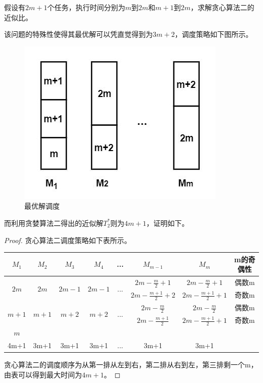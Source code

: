 \begin{example}
	假设有$2m+1$个任务，执行时间分别为$m$到$2m$和$m+1$到$2m$，求解贪心算法二的近似比。
\end{example}
该问题的特殊性使得其最优解可以凭直觉得到为$3m+2$，调度策略如下图所示。
\begin{figure}[hbt]
	\centering
	\includegraphics{image/example-problem-opt-solve.jpg}
	\caption{最优解调度}\label{fig:example-problem-opt-solve}
\end{figure}

而利用贪婪算法二得出的近似解$T_2^*$则为$4m+1$，证明如下。
\begin{proof}
	贪心算法二调度策略如下表所示。
	\begin{table}[]
	\begin{tabular}{cccccccc}
	\hline
	$M_1$					&	$M_2$					&	$M_3$					&	$M_4$					&	...											&	$M_{m-1}$			&	$M_m$				&	m的奇偶性	\\ \hline
	\multirow{2}{*}{$2m$}	&	\multirow{2}{*}{$2m$}	&	\multirow{2}{*}{$2m-1$}	&	\multirow{2}{*}{$2m-1$}	&	\multicolumn{1}{c|}{\multirow{2}{*}{...}}	&	$2m-\frac{m}{2}+1$	&	$2m-\frac{m}{2}+1$	&	偶数m		\\ \cline{6-8} 
							&							&							&							&	\multicolumn{1}{c|}{}						&	$2m-\frac{m+1}{2}+2$&	$2m-\frac{m+1}{2}+1$&	奇数m		\\ \hline
	\multirow{2}{*}{$m+1$}	&	\multirow{2}{*}{$m+1$}	&	\multirow{2}{*}{$m+2$}	&	\multirow{2}{*}{$m+2$}	&	\multicolumn{1}{c|}{\multirow{2}{*}{...}}	&	$2m-\frac{m}{2}$	&	$2m-\frac{m}{2}$	&	偶数m		\\ \cline{6-8} 
							&							&							&							&	\multicolumn{1}{c|}{}						&	$2m-\frac{m+1}{2}$	&	$2m-\frac{m+1}{2}+1$&	奇数m		\\ \hline
	$m$						&							&							&							&												&						&						&				\\ \hline
	4m+1					&	3m+1					&	3m+1					&	3m+1					&	...											&	3m+1				&	3m+1				&
	\end{tabular}
	\end{table}
	
	贪心算法二的调度顺序为从第一排从左到右，第二排从右到左，第三排剩一个m，由表可以得到最大时间为$4m+1$。
\end{proof}

